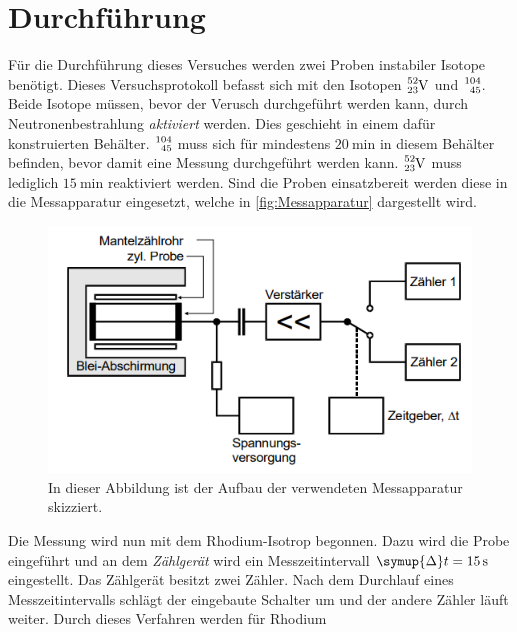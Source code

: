 \section{Durchführung}
\label{sec:Durchführung}
Für die Durchführung dieses Versuches werden zwei Proben instabiler Isotope benötigt. Dieses Versuchsprotokoll befasst sich mit den Isotopen $\ce{^{52}_{23}V}$ und 
$\ce{^{104}_{45}}$. Beide Isotope müssen, bevor der Verusch durchgeführt werden kann, durch Neutronenbestrahlung \textit{aktiviert} werden. Dies geschieht in einem dafür
konstruierten Behälter. $\ce{^{104}_{45}}$ muss sich für mindestens $\qty{20}{\minute}$ in diesem Behälter befinden, bevor damit eine Messung durchgeführt werden kann. 
$\ce{^{52}_{23}V}$ muss lediglich $\qty{15}{\minute}$ reaktiviert werden. Sind die Proben einsatzbereit werden diese in die Messapparatur eingesetzt, welche in
\autoref{fig:Messapparatur} dargestellt wird.  

\begin{figure}
    \centering
    \includegraphics[width = .7\textwidth]{content/Skizzeapparatur.png}
    \caption{In dieser Abbildung ist der Aufbau der verwendeten Messapparatur skizziert. \cite{v702}}
    \label{fig:Messapparatur}
\end{figure}

Die Messung wird nun mit dem Rhodium-Isotrop begonnen. Dazu wird die Probe eingeführt und an dem \textit{Zählgerät} wird ein Messzeitintervall $\symup{\Delta}t = \qty{15}{\second}$
eingestellt. Das Zählgerät besitzt zwei Zähler. Nach dem Durchlauf eines Messzeitintervalls schlägt der eingebaute Schalter um und der andere Zähler läuft weiter. Durch dieses 
Verfahren werden für Rhodium